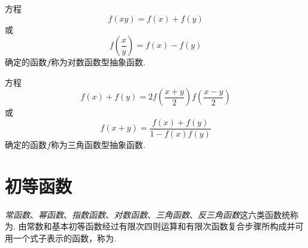方程\[
f(xy) = f(x) + f(y)
\]或\[
f\left(\frac{x}{y}\right) = f(x) - f(y)
\]确定的函数\(f\)称为对数函数型抽象函数.

方程\[
f(x) + f(y) = 2 f\left(\frac{x+y}{2}\right) f\left(\frac{x-y}{2}\right)
\]或\[
f(x+y) = \frac{f(x) + f(y)}{1 - f(x) f(y)}
\]确定的函数\(f\)称为三角函数型抽象函数.

\section{初等函数}
\begin{definition}
\emph{常函数}、\emph{幂函数}、\emph{指数函数}、\emph{对数函数}、\emph{三角函数}、\emph{反三角函数}这六类函数统称为.
由常数和基本初等函数经过有限次四则运算和有限次函数复合步骤所构成并可用一个式子表示的函数，称为.
\end{definition}
